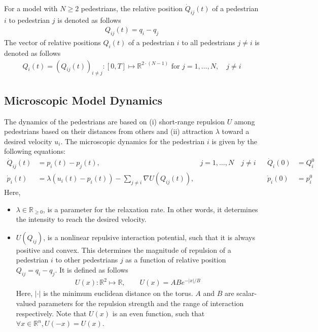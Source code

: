 For a model with $N \geq 2$ pedestrians, the relative position $\dot Q_{ij}(t)$ of a pedestrian $i$ to pedestrian $j$ is denoted as follows
\begin{align*}
    {Q}_{ij}(t) = q_i - q_j
\end{align*}
The vector of relative positions $Q_i(t)$ of a pedestrian $i$ to all pedestrians $j \neq i$ is denoted as follows
\begin{align*}
    {Q}_{i}(t) = ({Q}_{ij}(t))_{i\neq j} : [0,T] \mapsto \mathbb{R}^{2\cdot(N-1)} \text{ for } j = 1,\dots, N, \quad j \neq i
\end{align*}


\subsection{Microscopic Model Dynamics}
\label{section:micro_model_dynamics}
The dynamics of the pedestrians are based on (i) short-range repulsion $U$ among pedestrians based on their distances from others and (ii) attraction $\lambda$ toward a desired velocity $u_i$. The microscopic dynamics for the pedestrian $i$ is given by the following equations:
\begin{equation}
\begin{aligned}
    \dot Q_{ij}(t) &= p_i(t) - p_j(t), &j = 1,\dots,N \quad j \neq i& & \dot Q_i(0) &= Q^0_i \\
    \dot p_i(t) &= \lambda(u_i(t) - p_i(t)) - \sum_{j \neq i} \nabla U (Q_{ij}(t)), && & \dot p_i(0) &= p^0_i
\end{aligned}
\label{eq:micro}
\end{equation}
Here,
\begin{itemize}
    \item $\lambda \in \mathbb{R}_{\geq 0}$, is a parameter for the relaxation rate. In other words, it determines the intensity to reach the desired velocity. 
    \item $U(Q_{ij})$, is a nonlinear repulsive interaction potential, such that it is always positive and convex. This determines the magnitude of repulsion of a pedestrian $i$ to other pedestrians $j$ as a function of relative position $Q_{ij} = q_i - q_j$. It is defined as follows 
    \begin{align} 
        U(x) : \mathbb{R}^2 \mapsto \mathbb{R}, \quad\quad U(x) = ABe^{-|x|/B}
        \label{eq:def_potU}
    \end{align}
    Here, $|\cdot|$ is the minimum euclidean distance on the torus. $A$ and $B$ are scalar-valued parameters for the repulsion strength and the range of interaction respectively. Note that $U(x)$ is an even function, such that $\forall x \in \mathbb{R}^n, U(-x) = U(x)$. 
\end{itemize}

